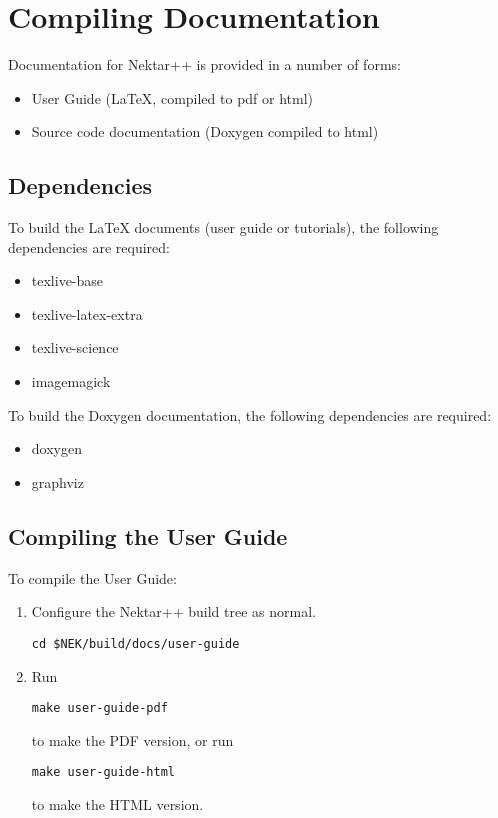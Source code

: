 \section{Compiling Documentation}
Documentation for Nektar++ is provided in a number of forms:
\begin{itemize}
\item User Guide (LaTeX, compiled to pdf or html)
\item Source code documentation (Doxygen compiled to html)
\end{itemize}

\subsection{Dependencies}
To build the LaTeX documents (user guide or tutorials), the following
dependencies are required:
\begin{itemize}
\item texlive-base
\item texlive-latex-extra
\item texlive-science
\item imagemagick
\end{itemize}

To build the Doxygen documentation, the following dependencies are required:
\begin{itemize}
\item doxygen
\item graphviz
\end{itemize}

\subsection{Compiling the User Guide}

To compile the User Guide:
\begin{enumerate}
\item Configure the Nektar++ build tree as normal.
    \begin{lstlisting}[style=BashInputStyle]
cd $NEK/build/docs/user-guide
\end{lstlisting}
\item Run
    \begin{lstlisting}[style=BashInputStyle]
make user-guide-pdf
\end{lstlisting}
to make the PDF version, or run
\begin{lstlisting}[style=BashInputStyle]
make user-guide-html
\end{lstlisting}
to make the HTML version.
\end{enumerate}

